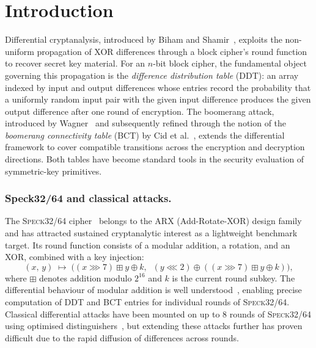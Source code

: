 \documentclass[runningheads]{llncs}
\newcommand{\speck}{\textsc{Speck}32/64}
\newcommand{\xor}{\oplus}
\newcommand{\ror}[2]{(#1 \ggg #2)}
\newcommand{\rol}[2]{(#1 \lll #2)}
\begin{document}
\section{Introduction}
\label{sec:intro}

Differential cryptanalysis, introduced by Biham and
Shamir~\cite{BS91}, exploits the non-uniform propagation of XOR
differences through a block cipher's round function to recover secret
key material.  For an $n$-bit block cipher, the fundamental object
governing this propagation is the \emph{difference distribution table}
(DDT): an array indexed by input and output differences whose entries
record the probability that a uniformly random input pair with the
given input difference produces the given output difference after one
round of encryption.  The boomerang attack, introduced by
Wagner~\cite{Wag99} and subsequently refined through the notion of the
\emph{boomerang connectivity table} (BCT) by Cid et
al.~\cite{CHPSS18}, extends the differential framework to cover
compatible transitions across the encryption and decryption
directions.  Both tables have become standard tools in the security
evaluation of symmetric-key primitives.

\subsubsection{Speck32/64 and classical attacks.}
The \speck{} cipher~\cite{BRRSSST13} belongs to the ARX (Add-Rotate-XOR)
design family and has attracted sustained cryptanalytic interest as a
lightweight benchmark target.  Its round function consists of a
modular addition, a rotation, and an XOR, combined with a key
injection:
\begin{equation}
  \label{eq:speck-round}
  (x,\,y) \;\mapsto\;
  \bigl(\ror{x}{7} \boxplus y \xor k,\;\;
        \rol{y}{2} \xor (\ror{x}{7} \boxplus y \xor k)\bigr),
\end{equation}
where $\boxplus$ denotes addition modulo $2^{16}$ and $k$ is the
current round subkey.  The differential behaviour of modular
addition is well understood~\cite{LM01}, enabling precise computation
of DDT and BCT entries for individual rounds of \speck{}.  Classical
differential attacks have been mounted on up to 8 rounds of \speck{}
using optimised distinguishers~\cite{ALLW14,KLT15}, but extending
these attacks further has proven difficult due to the rapid diffusion
of differences across rounds.
\end{document}
